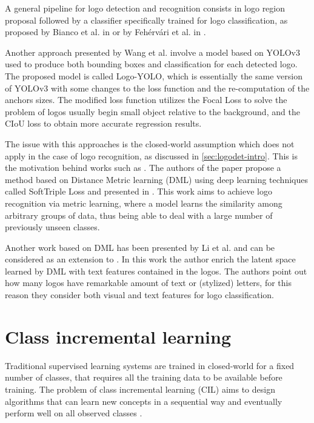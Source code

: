 A general pipeline for logo detection and recognition consists in logo region proposal followed by a classifier specifically trained for logo classification, as proposed by Bianco et al. in \cite{bianco2017deep} or by Fehérvári et al. in \cite{fehervari2019scalable}.

Another approach presented by Wang et al. \cite{wang2022logodet} involve a model based on YOLOv3 \cite{redmon2018yolov3} used to produce both bounding boxes and classification for each detected logo. The proposed model is called Logo-YOLO, which is essentially the same version of YOLOv3 with some changes to the loss function and the re-computation of the anchors sizes. The modified loss function utilizes the Focal Loss \cite{lin2017focal} to solve the problem of logos usually begin small object relative to the background, and the  CIoU loss \cite{zheng2020distance} to obtain more accurate regression results.

The issue with this approaches is the closed-world assumption which does not apply in the case of logo recognition, as discussed in \autoref{sec:logodet-intro}. This is the motivation behind works such as \cite{fehervari2019scalable}. The authors of the paper propose a method based on Distance Metric learning (DML) using deep learning techniques called SoftTriple Loss and presented in \cite{qian2019softtriple}. This work aims to achieve logo recognition via metric learning, where a model learns the similarity among arbitrary groups of data, thus being able to deal with a large number of previously unseen classes.

Another work based on DML has been presented by Li et al. \cite{li2022seetek} and can be considered as an extension to \cite{fehervari2019scalable}. In this work the author enrich the latent space learned by DML with text features contained in the logos. The authors point out how many logos have remarkable amount of text or (stylized) letters, for this reason they consider both visual and text features for logo classification.

\section{Class incremental learning}
Traditional supervised learning systems are trained in closed-world for a fixed
number of classes, that requires all the training data to be available before training.
The problem of class incremental learning (CIL) aims to design algorithms that can learn new concepts in a sequential way and eventually perform well on all observed classes \cite{yan2021dynamically}.

